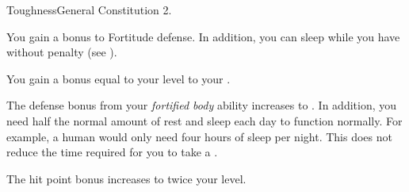     \begin{feat}{Toughness}{General}
        \featpre Constitution 2.

         You gain a  bonus to Fortitude defense.
        In addition, you can sleep while you have  without penalty (see ).

         You gain a bonus equal to your level to your .

         The defense bonus from your \textit{fortified body} ability increases to .
        In addition, you need half the normal amount of rest and sleep each day to function normally.
        For example, a human would only need four hours of sleep per night.
        This does not reduce the time required for you to take a .

         The hit point bonus increases to twice your level.
    \end{feat}

